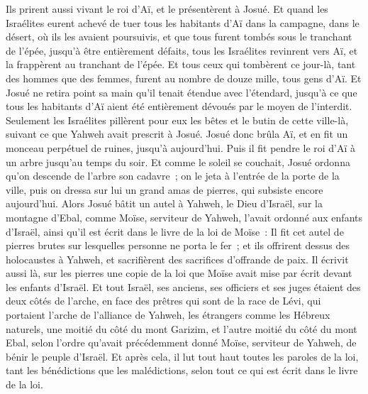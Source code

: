 \begin{multicols}{2}
Ils prirent aussi vivant le roi d'Aï, et le présentèrent à Josué.
Et quand les Israélites eurent achevé de tuer tous les habitants d'Aï dans la campagne, dans le désert, où ils les avaient poursuivis, et que tous furent tombés sous le tranchant de l'épée, jusqu'à être entièrement défaits, tous les Israélites revinrent vers Aï, et la frappèrent au tranchant de l'épée.
Et tous ceux qui tombèrent ce jour-là, tant des hommes que des femmes, furent au nombre de douze mille, tous gens d'Aï.
Et Josué ne retira point sa main qu'il tenait étendue avec l’étendard, jusqu'à ce que tous les habitants d'Aï aient été entièrement dévoués par le moyen de l'interdit.
Seulement les Israélites pillèrent pour eux les bêtes et le butin de cette ville-là, suivant ce que Yahweh avait prescrit à Josué.
Josué donc brûla Aï, et en fit un monceau perpétuel de ruines, jusqu'à aujourd'hui.
Puis il fit pendre le roi d'Aï à un arbre jusqu'au temps du soir. Et comme le soleil se couchait, Josué ordonna qu'on descende de l'arbre son cadavre~; on le jeta à l'entrée de la porte de la ville, puis on dressa sur lui un grand amas de pierres, qui subsiste encore aujourd'hui.
Alors Josué bâtit un autel à Yahweh, le Dieu d'Israël, sur la montagne d'Ebal,
comme Moïse, serviteur de Yahweh, l'avait ordonné aux enfants d'Israël, ainsi qu'il est écrit dans le livre de la loi de Moïse~: Il fit cet autel de pierres brutes sur lesquelles personne ne porta le fer~; et ils offrirent dessus des holocaustes à Yahweh, et sacrifièrent des sacrifices d'offrande de paix.
Il écrivit aussi là, sur les pierres une copie de la loi que Moïse avait mise par écrit devant les enfants d'Israël.
Et tout Israël, ses anciens, ses officiers et ses juges étaient des deux côtés de l'arche, en face des prêtres qui sont de la race de Lévi, qui portaient l'arche de l'alliance de Yahweh, les étrangers comme les Hébreux naturels, une moitié du côté du mont Garizim, et l'autre moitié du côté du mont Ebal, selon l'ordre qu'avait précédemment donné Moïse, serviteur de Yahweh, de bénir le peuple d'Israël.
Et après cela, il lut tout haut toutes les paroles de la loi, tant les bénédictions que les malédictions, selon tout ce qui est écrit dans le livre de la loi.

\end{multicols}

